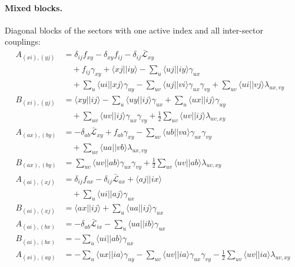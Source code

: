 \documentclass[aip,jcp,reprint,noshowkeys,superscriptaddress]{revtex4-1}
\begin{document}
\paragraph*{Mixed blocks.}
Diagonal blocks of the sectors with one active index and all inter-sector
couplings:
\begin{align}
  A_{(xi),(yj)} &= \delta_{ij}f_{xy} -\delta_{xy}f_{ij} -\delta_{ij}\bar{\mathcal L}_{xy} \nonumber\\
  &\quad +f_{ij}\gamma_{xy} +\langle xj||iy\rangle -\sum_{u}\langle uj||iy\rangle\gamma_{ux} \nonumber\\
  &\quad +\sum_{u}\langle ui||xj\rangle\gamma_{uy} -\sum_{uv}\langle uj||vi\rangle\gamma_{ux}\gamma_{vy} +\sum_{uv}\langle ui||vj\rangle\lambda_{ux,vy}
  \label{eq:ph-A-ca-ca}\\
  B_{(xi),(yj)} &= \langle xy||ij\rangle -\sum_{u}\langle uy||ij\rangle\gamma_{ux} +\sum_{u}\langle ux||ij\rangle\gamma_{uy} \nonumber\\
  &\quad +\sum_{uv}\langle uv||ij\rangle\gamma_{ux}\gamma_{vy} +\tfrac{1}{2}\sum_{uv}\langle uv||ij\rangle\lambda_{uv,xy}
  \label{eq:ph-B-ca-ca}\\
  A_{(ax),(by)} &= -\delta_{ab}\bar{\mathcal L}_{xy} +f_{ab}\gamma_{xy} -\sum_{uv}\langle ub||va\rangle\gamma_{ux}\gamma_{vy} \nonumber\\
  &\quad +\sum_{uv}\langle ua||vb\rangle\lambda_{ux,vy}
  \label{eq:ph-A-av-av}\\
  B_{(ax),(by)} &= \sum_{uv}\langle uv||ab\rangle\gamma_{ux}\gamma_{vy} +\tfrac{1}{2}\sum_{uv}\langle uv||ab\rangle\lambda_{uv,xy}
  \label{eq:ph-B-av-av}\\
  A_{(ai),(xj)} &= \delta_{ij}f_{ax} -\delta_{ij}\bar{\mathcal L}_{ax} +\langle aj||ix\rangle \nonumber\\
  &\quad +\sum_{u}\langle ui||aj\rangle\gamma_{ux}
  \label{eq:ph-A-cv-ca}\\
  B_{(ai),(xj)} &= \langle ax||ij\rangle +\sum_{u}\langle ua||ij\rangle\gamma_{ux}
  \label{eq:ph-B-cv-ca}\\
  A_{(ai),(bx)} &= -\delta_{ab}\bar{\mathcal L}_{ix} -\sum_{u}\langle ua||ib\rangle\gamma_{ux}
  \label{eq:ph-A-cv-av}\\
  B_{(ai),(bx)} &= -\sum_{u}\langle ui||ab\rangle\gamma_{ux}
  \label{eq:ph-B-cv-av}\\
  A_{(xi),(ay)} &= -\sum_{u}\langle ux||ia\rangle\gamma_{uy} -\sum_{uv}\langle uv||ia\rangle\gamma_{ux}\gamma_{vy} -\tfrac{1}{2}\sum_{uv}\langle uv||ia\rangle\lambda_{uv,xy}
  \label{eq:ph-A-ca-av}\\

\end{align}
\end{document}
